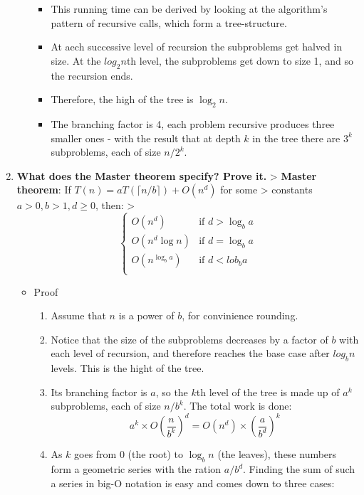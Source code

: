\documentclass[a4paper,11pt]{article}
\begin{document}
\begin{enumerate}
\begin{itemize}
    \begin{itemize}
    \itemsep1pt\parskip0pt
    \item
      This running time can be derived by looking at the algorithm's
      pattern of recursive calls, which form a tree-structure.
    \item
      At aech successive level of recursion the subproblems get halved
      in size. At the $log_2 n$th level, the subproblems get down to
      size 1, and so the recursion ends.
    \item
      Therefore, the high of the tree is $\log_2 n$.
    \item
      The branching factor is 4, each problem recursive produces three
      smaller ones - with the result that at depth $k$ in the tree there
      are $3^k$ subproblems, each of size $n / 2^k$.
    \end{itemize}
  \end{itemize}
\item
  \textbf{What does the Master theorem specify? Prove it.}
  \textgreater{} \textbf{Master theorem}: If
  $T(n) = aT(\lceil n / b \rceil) + O(n^d)$ for some \textgreater{}
  constants $a > 0, b > 1, d \ge 0$, then: \textgreater{}
  \[\begin{cases} O(n^d) &\mbox{if } d > \log_b a \\ O(n^d \log n) &\mbox{if } d = \log_b a \\ O(n^{\log_b a}) &\mbox{if } d < lob_b a \\ \end{cases}\]

  \begin{itemize}
  \itemsep1pt\parskip0pt
  \item
    Proof

    \begin{enumerate}
    \def\labelenumii{\arabic{enumii}.}
    \itemsep1pt\parskip0pt
    \item
      Assume that $n$ is a power of $b$, for convinience rounding.
    \item
      Notice that the size of the subproblems decreases by a factor of
      $b$ with each level of recursion, and therefore reaches the base
      case after $log_b n$ levels. This is the hight of the tree.
    \item
      Its branching factor is $a$, so the $k$th level of the tree is
      made up of $a^k$ subproblems, each of size $n / b^k$. The total
      work is done:
      \[a^k \times O(\frac{n}{b^k})^d = O(n^d) \times (\frac{a}{b^d})^k\]
    \item
      As $k$ goes from 0 (the root) to $\log_b n$ (the leaves), these
      numbers form a geometric series with the ration $a / b^d$. Finding
      the sum of such a series in big-O notation is easy and comes down
      to three cases:


\end{enumerate}
\end{itemize}
\end{enumerate}
\end{document}

